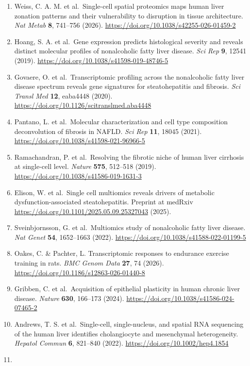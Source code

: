 \begin{enumerate}
\item
  Weiss, C. A. M. et al.~Single-cell spatial proteomics maps human liver zonation patterns and their vulnerability to disruption in tissue architecture. \emph{Nat Metab} \textbf{8}, 741--756 (2026). \url{https://doi.org/10.1038/s42255-026-01459-2}
\item
  Hoang, S. A. et al.~Gene expression predicts histological severity and reveals distinct molecular profiles of nonalcoholic fatty liver disease. \emph{Sci Rep} \textbf{9}, 12541 (2019). \url{https://doi.org/10.1038/s41598-019-48746-5}
\item
  Govaere, O. et al.~Transcriptomic profiling across the nonalcoholic fatty liver disease spectrum reveals gene signatures for steatohepatitis and fibrosis. \emph{Sci Transl Med} \textbf{12}, eaba4448 (2020). \url{https://doi.org/10.1126/scitranslmed.aba4448}
\item
  Pantano, L. et al.~Molecular characterization and cell type composition deconvolution of fibrosis in NAFLD. \emph{Sci Rep} \textbf{11}, 18045 (2021). \url{https://doi.org/10.1038/s41598-021-96966-5}
\item
  Ramachandran, P. et al.~Resolving the fibrotic niche of human liver cirrhosis at single-cell level. \emph{Nature} \textbf{575}, 512--518 (2019). \url{https://doi.org/10.1038/s41586-019-1631-3}
\item
  Elison, W. et al.~Single cell multiomics reveals drivers of metabolic dysfunction-associated steatohepatitis. Preprint at medRxiv \url{https://doi.org/10.1101/2025.05.09.25327043} (2025).
\item
  Sveinbjornsson, G. et al.~Multiomics study of nonalcoholic fatty liver disease. \emph{Nat Genet} \textbf{54}, 1652--1663 (2022). \url{https://doi.org/10.1038/s41588-022-01199-5}
\item
  Oakes, C. \& Pachter, L. Transcriptomic responses to endurance exercise training in rats. \emph{BMC Genom Data} \textbf{27}, 74 (2026). \url{https://doi.org/10.1186/s12863-026-01440-8}
\item
  Gribben, C. et al.~Acquisition of epithelial plasticity in human chronic liver disease. \emph{Nature} \textbf{630}, 166--173 (2024). \url{https://doi.org/10.1038/s41586-024-07465-2}
\item
  Andrews, T. S. et al.~Single-cell, single-nucleus, and spatial RNA sequencing of the human liver identifies cholangiocyte and mesenchymal heterogeneity. \emph{Hepatol Commun} \textbf{6}, 821--840 (2022). \url{https://doi.org/10.1002/hep4.1854}
\item

\end{enumerate}
